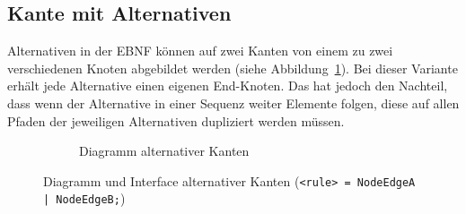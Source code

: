 \documentclass[../InterneDSLs.tex]{subfiles}
\begin{document}
\subsection{Kante mit Alternativen}\label{SEC:Alternative}
Alternativen in der EBNF können auf zwei Kanten von einem zu zwei verschiedenen Knoten abgebildet werden (siehe Abbildung~\ref{FIG:DiagramAlternativeNodeVariant}). Bei dieser Variante erhält jede Alternative einen eigenen End-Knoten. Das hat jedoch den Nachteil, dass wenn der Alternative in einer Sequenz weiter Elemente folgen, diese auf allen Pfaden der jeweiligen Alternativen dupliziert werden müssen.
\begin{figure}[ht]
\centering
  \begin{subfigure}[c]{0.49\textwidth}
    \caption{Diagramm alternativer Kanten}
    \label{FIG:DiagramAlternativeNodeVariant}
  \end{subfigure}
  \begin{subfigure}[c]{0.49\textwidth}
    
  \end{subfigure}
  \caption{Diagramm und Interface alternativer Kanten (\texttt{<rule> = NodeEdgeA | NodeEdgeB;})}
  \label{FIG:AlternativeNodeVariant}
\end{figure}
\end{document}
